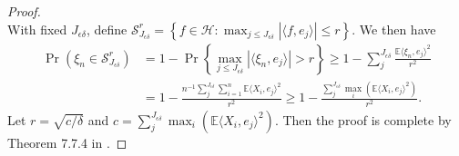 \documentclass[12pt, A4]{article}
\newcommand{\SumOverN}{\sum_{i=1}^n}
\newcommand{\Parentheses}[1]{ \left( #1 \right) }
\newcommand{\Curlybracket}[1]{ \left\{ #1 \right\} }
\begin{document}
\begin{proof}
$$            $$
        With fixed $J_{\epsilon\delta}$, define $\mathcal{S}^{r}_{J_{\epsilon\delta}} = \Curlybracket{ f \in \mathcal{H}: \max_{j\leq  J_{\epsilon\delta}} |\langle f, e_j \rangle| \leq r}$. We then have
            \begin{align*}
                \Pr \Parentheses{ \xi_n \in \mathcal{S}^{r}_{J_{\epsilon\delta}} } &= 1 - \Pr\Curlybracket{ \max_{j\leq  J_{\epsilon\delta}} |\langle \xi_n, e_j \rangle| > r } \geq 1- \sum_{j}^{J_{\epsilon\delta}} \frac{ \mathbb{E} \langle \xi_n, e_j \rangle ^2 }{r^2} \\
                &= 1 - \frac{ n^{-1}\sum_{j}^{J_{\epsilon\delta}}\SumOverN \mathbb{E} \langle X_i, e_j \rangle ^2 }{r^2} 
                \geq 1 - \frac{ \sum_{j}^{J_{\epsilon\delta}} \max_{i} \Parentheses{\mathbb{E} \langle X_i, e_j \rangle ^2 }}{r^2}.
            \end{align*}
        Let $ r = \sqrt{c/\delta} $ and $c = \sum_{j}^{J_{\epsilon\delta}} \max_{i} \Parentheses{\mathbb{E} \langle X_i, e_j \rangle ^2 }$. Then the proof is complete by Theorem 7.7.4 in \cite{hsing2015theoretical}.
    \end{proof}
\end{document}
